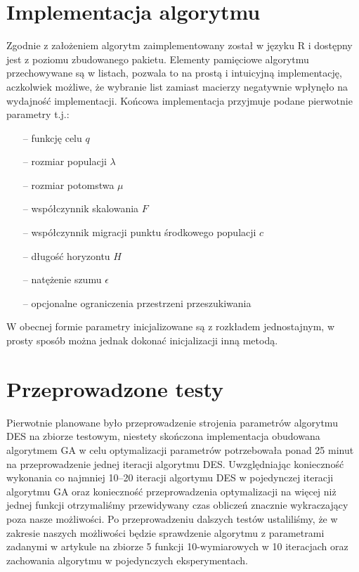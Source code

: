 \section{Implementacja algorytmu}
Zgodnie z założeniem algorytm zaimplementowany został w języku R i dostępny jest z poziomu zbudowanego pakietu. Elementy pamięciowe algorytmu przechowywane są w listach, pozwala to na prostą i intuicyjną implementację, aczkolwiek możliwe, że wybranie list zamiast macierzy negatywnie wpłynęło na wydajność implementacji. Końcowa implementacja przyjmuje podane pierwotnie parametry t.j.:

\begin{itemize}
\item[--] funkcję celu $q$
\item[--] rozmiar populacji $\lambda$
\item[--] rozmiar potomstwa $\mu$
\item[--] współczynnik skalowania $F$
\item[--] współczynnik migracji punktu środkowego populacji $c$
\item[--] długość horyzontu $H$
\item[--] natężenie szumu $\epsilon$
\item[--] opcjonalne ograniczenia przestrzeni przeszukiwania
\end{itemize}

W obecnej formie parametry inicjalizowane są z rozkładem jednostajnym, w prosty sposób można jednak dokonać inicjalizacji inną metodą.

\section{Przeprowadzone testy}
Pierwotnie planowane było przeprowadzenie strojenia parametrów algorytmu DES na zbiorze testowym, niestety skończona implementacja obudowana algorytmem GA w celu optymalizacji parametrów potrzebowała ponad 25 minut na przeprowadzenie jednej iteracji algorytmu DES. Uwzględniając konieczność wykonania co najmniej 10--20 iteracji algortymu DES w pojedynczej iteracji algorytmu GA oraz konieczność przeprowadzenia optymalizacji na więcej niż jednej funkcji otrzymaliśmy przewidywany czas obliczeń znacznie wykraczający poza nasze możliwości. Po przeprowadzeniu dalszych testów ustaliliśmy, że w zakresie naszych możliwości będzie sprawdzenie algorytmu z parametrami zadanymi w artykule na zbiorze 5 funkcji 10-wymiarowych w 10 iteracjach oraz zachowania algorytmu w pojedynczych eksperymentach.


